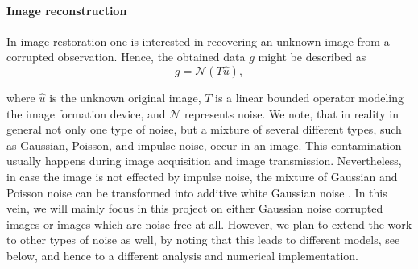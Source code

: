 \documentclass[enabledeprecatedfontcommands,cleardoublepage=empty,headsepline,twoside,11pt,DIV=15,BCOR=12mm,final]{scrartcl}
\begin{document}
\paragraph{Image reconstruction}

In image restoration one is interested in recovering an unknown image from a corrupted observation. Hence, the obtained data $g$ might be described as
\begin{equation}\label{eq:g}
g=\mathcal{N}(T\hat{u}),
\end{equation}

where $\hat{u}$ is the unknown original image, $T$ is a linear bounded operator modeling the image formation device, and $\mathcal{N}$ represents noise. %
We note, that in reality in general not only one type of noise, but a mixture of several different types, such as Gaussian, Poisson, and impulse noise, occur in an image. This contamination usually happens during image acquisition and image transmission. Nevertheless, in case the image is not effected by impulse noise, the mixture of Gaussian and Poisson noise can be transformed into additive white Gaussian noise \cite{}. In this vein, we will mainly focus in this project on either  Gaussian noise corrupted images or images which are noise-free at all. However, we plan to extend the work to other types of noise as well, by noting that this leads to different models, see below, and hence to a different analysis and numerical implementation. 
\end{document}
